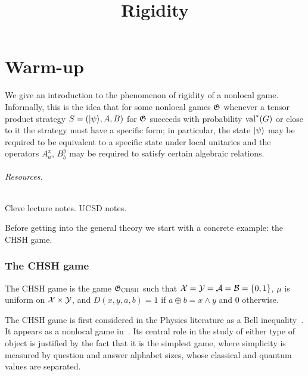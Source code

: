 



\part{Warm-up}
\label{book-part-warmup}

\title{Rigidity}
\label{rigidity}

\maketitle

\label{section-phantom}

\tableofcontents

We give an introduction to the phenomenon of rigidity of a nonlocal game. Informally, this is the idea that for some nonlocal games $\mathfrak{G}$ whenever a tensor product strategy ${S} = (|\psi\rangle,A,B)$ for $\mathfrak{G}$ succeeds with probability $\mathrm{val}^*(G)$ or close to it the strategy must have a specific form; in particular, the state $|\psi\rangle$ may be required to be equivalent to a specific state under local unitaries and the operators $A^x_a$, $B^y_b$ may be required to satisfy certain algebraic relations. 

\paragraph{Resources.} \label{resources} Cleve lecture notes. UCSD notes. 

Before getting into the general theory we start with a concrete example: the CHSH game. 

\section{The CHSH game}
\label{section-chsh}

\begin{definition}
\label{definition-chsh}
The CHSH game is the game $\mathfrak{G}_{\mathrm{CHSH}}$ such that $\mathcal{X} = \mathcal{Y} = \mathcal{A} = \mathcal{B} = \{0,1\}$, $\mu$ is uniform on $\mathcal{X} \times \mathcal{Y}$, and $D(x,y,a,b) = 1$ if $a\oplus b = x\wedge y$ and $0$ otherwise. 
\end{definition}

The CHSH game is first considered in the Physics literature as a Bell inequality~\cite{clauser1969proposed}. It appears as a nonlocal game in~\cite{cleve2004consequences}. Its central role in the study of either type of object is justified by the fact that it is the simplest game, where simplicity is measured by question and answer alphabet sizes, whose classical and quantum values are separated. 

